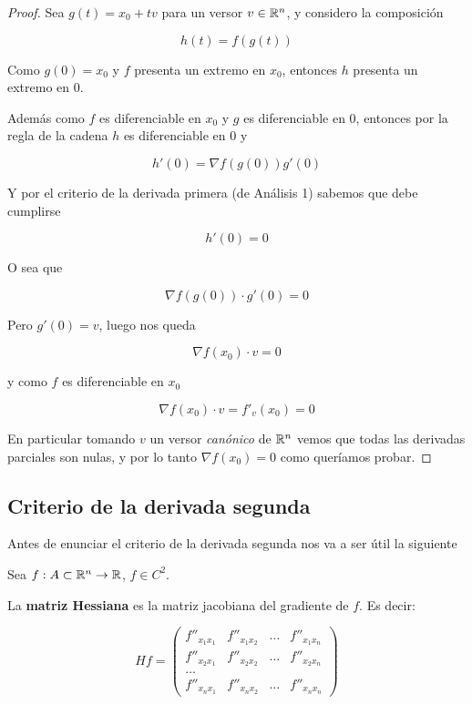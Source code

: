 \begin{proof}
Sea $g(t) = x_0 + t v$ para un versor $v \in \mathbb{R}^n$, y considero la composición 

$$h(t) = f(g(t))$$  

Como $g(0) = x_0$ y $f$ presenta un extremo en $x_0$, entonces $h$ presenta un extremo en $0$. 

Además como $f$ es diferenciable en $x_0$ y $g$ es diferenciable en $0$, entonces por la regla de la cadena $h$ es diferenciable en $0$ y

$$ h'(0) = \nabla f(g(0)) g'(0) $$

Y por el criterio de la derivada primera (de Análisis 1) sabemos que debe cumplirse 

$$ h'(0) = 0$$

O sea que

$$ \nabla f(g(0)) \cdot g'(0) = 0 $$

Pero $g'(0) = v$, luego nos queda

$$ \nabla f(x_0) \cdot v = 0$$

y como $f$ es diferenciable en $x_0$ 

$$ \nabla f(x_0) \cdot v = f'_v(x_0) = 0 $$

En particular tomando $v$ un versor \emph{canónico} de $\mathbb{R}^n$ vemos que todas las derivadas parciales son nulas, y por lo tanto $ \nabla f(x_0) = 0$ como queríamos probar.
\end{proof}

\subsection{Criterio de la derivada segunda}

Antes de enunciar el criterio de la derivada segunda nos va a ser útil la siguiente

\begin{definition}
Sea $f : A \subset \mathbb{R}^n \to \mathbb{R}$, $f \in C^2$.

La \textbf{matriz Hessiana}  es la matriz jacobiana del gradiente de $f$.  Es decir:

$$ Hf = \begin{pmatrix} f''_{x_1 x_1} & f''_{x_1 x_2} & \ldots & f''_{x_1 x_n} \\ f''_{x_2 x_1} & f''_{x_2 x_2} & \ldots & f''_{x_2 x_n} \\ \ldots \\ f''_{x_n x_1} & f''_{x_n x_2} & \ldots & f''_{x_n x_n} \end{pmatrix} $$

\end{definition}

